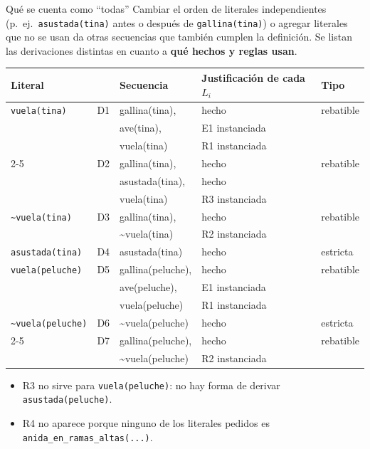 \documentclass[11pt,a4paper]{article}
\newcommand{\nf}{\textasciitilde}                 %
\begin{document}
\begin{aviso}{Qué se cuenta como ``todas''}
Cambiar el orden de literales independientes (p.~ej.\ \texttt{asustada(tina)} antes o después de \texttt{gallina(tina)}) o agregar literales que no se usan da otras secuencias que también cumplen la definición. Se listan las derivaciones distintas en cuanto a \textbf{qué hechos y reglas usan}.
\end{aviso}

\begin{center}
\small
\begin{tabularx}{\linewidth}{@{}l l >{\ttfamily}l X l@{}}
\toprule
\textbf{Literal} & & \textbf{\normalfont Secuencia} & \textbf{Justificación de cada $L_i$} & \textbf{Tipo} \\
\midrule
\texttt{vuela(tina)} & D1 & gallina(tina), & hecho & rebatible \\
 & & ave(tina), & E1 instanciada & \\
 & & vuela(tina) & R1 instanciada & \\
\cmidrule(l){2-5}
 & D2 & gallina(tina), & hecho & rebatible \\
 & & asustada(tina), & hecho & \\
 & & vuela(tina) & R3 instanciada & \\
\midrule
\texttt{\nf vuela(tina)} & D3 & gallina(tina), & hecho & rebatible \\
 & & \nf vuela(tina) & R2 instanciada & \\
\midrule
\texttt{asustada(tina)} & D4 & asustada(tina) & hecho & estricta \\
\midrule
\texttt{vuela(peluche)} & D5 & gallina(peluche), & hecho & rebatible \\
 & & ave(peluche), & E1 instanciada & \\
 & & vuela(peluche) & R1 instanciada & \\
\midrule
\texttt{\nf vuela(peluche)} & D6 & \nf vuela(peluche) & hecho & estricta \\
\cmidrule(l){2-5}
 & D7 & gallina(peluche), & hecho & rebatible \\
 & & \nf vuela(peluche) & R2 instanciada & \\
\bottomrule
\end{tabularx}
\end{center}

\begin{itemize}
  \item R3 no sirve para \texttt{vuela(peluche)}: no hay forma de derivar \texttt{asustada(peluche)}.
  \item R4 no aparece porque ninguno de los literales pedidos es \texttt{anida\_en\_ramas\_altas(...)}.
\end{itemize}
\end{document}
